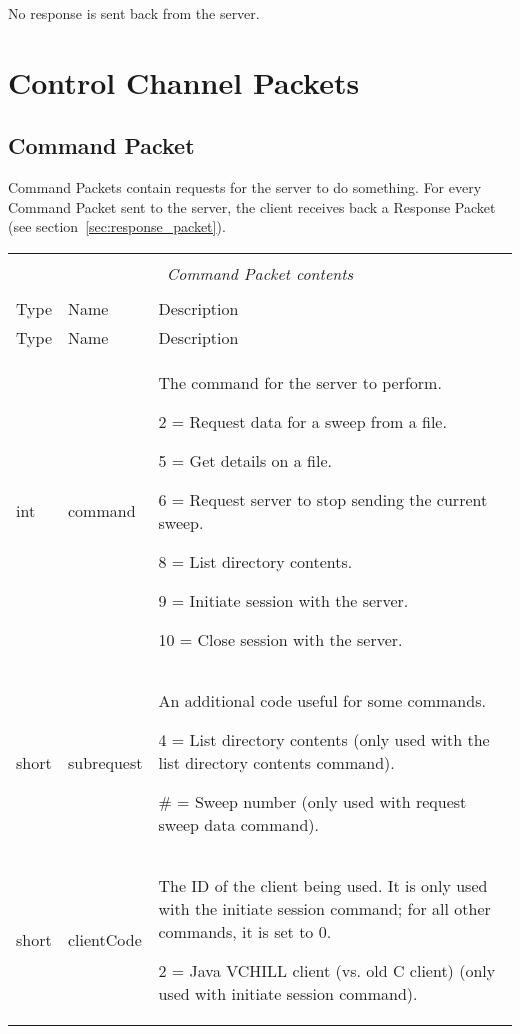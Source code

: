 \documentclass[10pt]{article}
\newcommand{\tblspc}{\rule{0pt}{3ex}}
\begin{document}
No response is sent back from the server.


\section{Control Channel Packets}
\label{sec:control_channel_packets}
\subsection{Command Packet}
\label{sec:command_packet}
Command Packets contain requests for the server to do something. For every Command Packet sent to the server, the client receives back a Response Packet (see section~\ref{sec:response_packet}).

\begin{longtable}{|p{}|l|p{}|}
\hline
\multicolumn{3}{|c|}{} \\
\multicolumn{3}{|c|}{\emph{Command Packet contents}} \\
\multicolumn{3}{|c|}{} \\
\hline Type & Name & Description \\ \hline \endfirsthead
\hline Type & Name & Description \\ \hline \endhead
\hline \endfoot
\tblspc int & command & The command for the server to perform.
	\par 2 = Request data for a sweep from a file.
	\par 5 = Get details on a file.
	\par 6 = Request server to stop sending the current sweep.
	\par 8 = List directory contents.
	\par 9 = Initiate session with the server.
	\par 10 = Close session with the server. \\
\hline
\tblspc short & subrequest & An additional code useful for some commands.
	\par 4 = List directory contents (only used with the list directory contents command).
	\par \# = Sweep number (only used with request sweep data command). \\
\hline
\tblspc short & clientCode & The ID of the client being used. It is only used with the initiate session command; for all other commands, it is set to 0.
	\par 2 = Java VCHILL client (vs. old C client) (only used with initiate session command). \\

\end{longtable}
\end{document}
